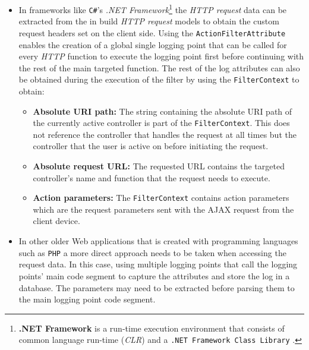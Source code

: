 \begin{itemize}
	\item In frameworks like \texttt{C\#}'s \emph{.NET Framework}\footnote{\label{ftn:ch2_NetFramework}\textbf{.NET Framework} is a run-time execution environment that consists of common language run-time (\emph{CLR}) and a \texttt{.NET Framework Class Library} \cite{Harkness2007}.} the \textit{HTTP request} data can be extracted from the in build \textit{HTTP request} models to obtain the custom request headers set on the client side. Using the \texttt{ActionFilterAttribute} enables the creation of a global single logging point that can be called for every \textit{HTTP} function to execute the logging point first before continuing with the rest of the main targeted function. The rest of the log attributes can also be obtained during the execution of the filter by using the \texttt{FilterContext} to obtain:
	\begin{itemize}
		\item \textbf{Absolute URI path:} The string containing the absolute URI path of the currently active controller is part of the \texttt{FilterContext}. This does not reference the controller that handles the request at all times but the controller that the user is active on before initiating the request.
		\item \textbf{Absolute request URL:} The requested URL contains the targeted controller's name and function that the request needs to execute. 
		\item \textbf{Action parameters:} The \texttt{FilterContext} contains action parameters which are the request parameters sent with the AJAX request from the client device.
	\end{itemize}
	\item In other older Web applications that is created with programming languages such as \texttt{PHP} a more direct approach needs to be taken when accessing the request data. In this case, using multiple logging points that call the logging points' main code segment to capture the attributes and store the log in a database. The parameters may need to be extracted before parsing them to the main logging point code segment.
\end{itemize}

